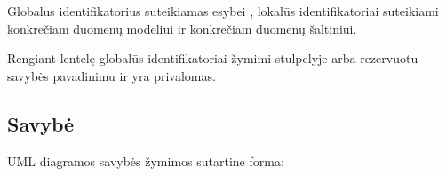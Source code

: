 \documentclass[letterpaper,10pt,lithuanian]{sphinxmanual}
\begin{document}
\sphinxAtStartPar
Globalus identifikatorius suteikiamas esybei , lokalūs
identifikatoriai suteikiami konkrečiam duomenų modeliui ir konkrečiam duomenų
šaltiniui.

\sphinxAtStartPar
Rengiant {\hyperref[\detokenize{savokos:term-DSA}]{}} lentelę globalūs identifikatoriai žymimi {\hyperref[\detokenize{dimensijos:model.ref}]{}}
stulpelyje arba rezervuotu savybės pavadinimu  ir yra privalomas.


\subsection{Savybė}
\label{\detokenize{modelis:savybe}}
\sphinxAtStartPar
UML diagramos savybės žymimos sutartine forma:
\end{document}
